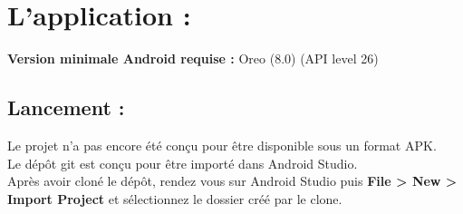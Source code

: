 \section{L'application :}
\textbf{Version minimale Android requise :} Oreo (8.0) (API level 26)

\subsection{Lancement :}
Le projet n'a pas encore été conçu pour être disponible sous un format APK.
\\
Le dépôt git est conçu pour être importé dans Android Studio.
\\
Après avoir cloné le dépôt, rendez vous sur Android Studio puis 
{\textbf {File > New > Import Project}}
et sélectionnez le dossier créé par le clone.

